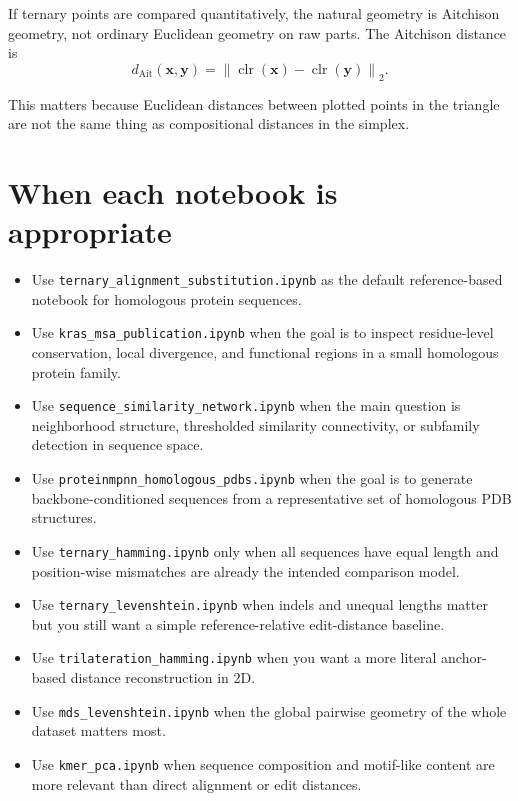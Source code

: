 \documentclass[11pt,a4paper]{article}
\begin{document}
If ternary points are compared quantitatively, the natural geometry is Aitchison geometry, not ordinary Euclidean geometry on raw parts. The Aitchison distance is
\[
d_{\mathrm{Ait}}(\bm{x},\bm{y})
=\left\|\operatorname{clr}(\bm{x})-\operatorname{clr}(\bm{y})\right\|_2.
\]

This matters because Euclidean distances between plotted points in the triangle are not the same thing as compositional distances in the simplex.

\section{When each notebook is appropriate}

\begin{itemize}[leftmargin=*]
\item Use \texttt{ternary\_alignment\_substitution.ipynb} as the default reference-based notebook for homologous protein sequences.
\item Use \texttt{kras\_msa\_publication.ipynb} when the goal is to inspect residue-level conservation, local divergence, and functional regions in a small homologous protein family.
\item Use \texttt{sequence\_similarity\_network.ipynb} when the main question is neighborhood structure, thresholded similarity connectivity, or subfamily detection in sequence space.
\item Use \texttt{proteinmpnn\_homologous\_pdbs.ipynb} when the goal is to generate backbone-conditioned sequences from a representative set of homologous PDB structures.
\item Use \texttt{ternary\_hamming.ipynb} only when all sequences have equal length and position-wise mismatches are already the intended comparison model.
\item Use \texttt{ternary\_levenshtein.ipynb} when indels and unequal lengths matter but you still want a simple reference-relative edit-distance baseline.
\item Use \texttt{trilateration\_hamming.ipynb} when you want a more literal anchor-based distance reconstruction in 2D.
\item Use \texttt{mds\_levenshtein.ipynb} when the global pairwise geometry of the whole dataset matters most.
\item Use \texttt{kmer\_pca.ipynb} when sequence composition and motif-like content are more relevant than direct alignment or edit distances.
\end{itemize}
\end{document}
